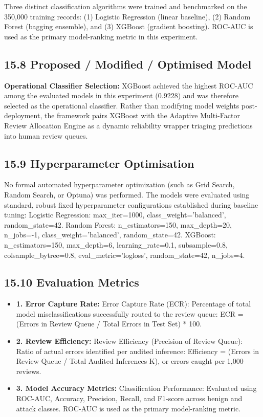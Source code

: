 Three distinct classification algorithms were trained and benchmarked on the 350,000 training records: (1) Logistic Regression (linear baseline), (2) Random Forest (bagging ensemble), and (3) XGBoost (gradient boosting). ROC-AUC is used as the primary model-ranking metric in this experiment.

\subsection{15.8 Proposed / Modified / Optimised Model}

\textbf{Operational Classifier Selection:} XGBoost achieved the highest ROC-AUC among the evaluated models in this experiment (0.9228) and was therefore selected as the operational classifier. Rather than modifying model weights post-deployment, the framework pairs XGBoost with the Adaptive Multi-Factor Review Allocation Engine as a dynamic reliability wrapper triaging predictions into human review queues.

\subsection{15.9 Hyperparameter Optimisation}

No formal automated hyperparameter optimization (such as Grid Search, Random Search, or Optuna) was performed. The models were evaluated using standard, robust fixed hyperparameter configurations established during baseline tuning:
 Logistic Regression: max\_iter=1000, class\_weight='balanced', random\_state=42.
 Random Forest: n\_estimators=150, max\_depth=20, n\_jobs=-1, class\_weight='balanced', random\_state=42.
 XGBoost: n\_estimators=150, max\_depth=6, learning\_rate=0.1, subsample=0.8, colsample\_bytree=0.8, eval\_metric='logloss', random\_state=42, n\_jobs=4.

\subsection{15.10 Evaluation Metrics}

\begin{itemize}
\item \textbf{1. Error Capture Rate:} Error Capture Rate (ECR): Percentage of total model misclassifications successfully routed to the review queue: ECR = (Errors in Review Queue / Total Errors in Test Set) * 100.
\item \textbf{2. Review Efficiency:} Review Efficiency (Precision of Review Queue): Ratio of actual errors identified per audited inference: Efficiency = (Errors in Review Queue / Total Audited Inferences K), or errors caught per 1,000 reviews.
\item \textbf{3. Model Accuracy Metrics:} Classification Performance: Evaluated using ROC-AUC, Accuracy, Precision, Recall, and F1-score across benign and attack classes. ROC-AUC is used as the primary model-ranking metric.
\end{itemize}

